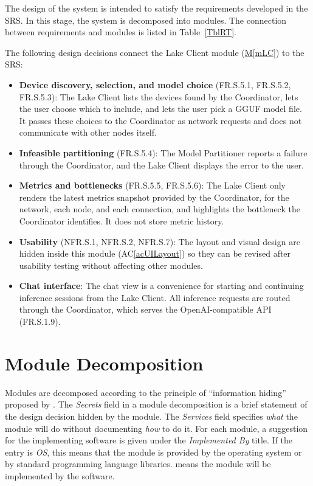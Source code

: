 \documentclass[12pt, titlepage]{article}
\newcommand{\acref}[1]{AC\ref{#1}}
\newcommand{\mref}[1]{\hyperref[sec:#1]{M\ref*{#1}}}
\begin{document}
The design of the system is intended to satisfy the requirements developed in
the SRS. In this stage, the system is decomposed into modules. The connection
between requirements and modules is listed in Table~\ref{TblRT}.

The following design decisions connect the Lake Client module (\mref{mLC}) to the SRS:
\begin{itemize}
\item \textbf{Device discovery, selection, and model choice} (FR.S.5.1, FR.S.5.2, FR.S.5.3): The Lake Client lists the devices found by the Coordinator, lets the user choose which to include, and lets the user pick a GGUF model file. It passes these choices to the Coordinator as network requests and does not communicate with other nodes itself.
\item \textbf{Infeasible partitioning} (FR.S.5.4): The Model Partitioner reports a failure through the Coordinator, and the Lake Client displays the error to the user.
\item \textbf{Metrics and bottlenecks} (FR.S.5.5, FR.S.5.6): The Lake Client only renders the latest metrics snapshot provided by the Coordinator, for the network, each node, and each connection, and highlights the bottleneck the Coordinator identifies. It does not store metric history.
\item \textbf{Usability} (NFR.S.1, NFR.S.2, NFR.S.7): The layout and visual design are hidden inside this module (\acref{acUILayout}) so they can be revised after usability testing without affecting other modules.
\item \textbf{Chat interface}: The chat view is a convenience for starting and continuing inference sessions from the Lake Client. All inference requests are routed through the Coordinator, which serves the OpenAI-compatible API (FR.S.1.9).
\end{itemize}

\section{Module Decomposition} \label{SecMD}

Modules are decomposed according to the principle of ``information hiding''
proposed by \citet{ParnasEtAl1984}. The \emph{Secrets} field in a module
decomposition is a brief statement of the design decision hidden by the
module. The \emph{Services} field specifies \emph{what} the module will do
without documenting \emph{how} to do it. For each module, a suggestion for the
implementing software is given under the \emph{Implemented By} title. If the
entry is \emph{OS}, this means that the module is provided by the operating
system or by standard programming language libraries.  \emph{\progname{}} means the
module will be implemented by the \progname{} software.
\end{document}
